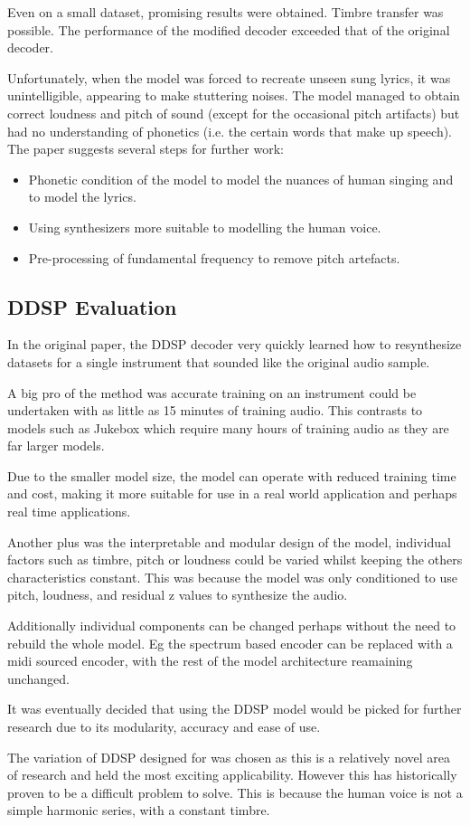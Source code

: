 Even on a small dataset, promising results were obtained. Timbre transfer was possible. The performance of the modified decoder exceeded that of the original decoder.

Unfortunately, when the model was forced to recreate unseen sung lyrics, it was unintelligible, appearing to make stuttering noises. The model managed to obtain correct loudness and pitch of sound (except for the occasional pitch artifacts) but had no understanding of phonetics (i.e. the certain words that make up speech). The paper suggests several steps for further work:

\begin{itemize}
    \item Phonetic condition of the model to model the nuances of human singing and to model the lyrics.
    \item Using synthesizers more suitable to modelling the human voice.
    \item Pre-processing of fundamental frequency to remove pitch artefacts.
\end{itemize}

\subsection{DDSP Evaluation}

In the original paper, the DDSP decoder very quickly learned how to resynthesize datasets for a single instrument that sounded like the original audio sample.

A big pro of the method was accurate training on an instrument could be undertaken with as little as 15 minutes of training audio. This contrasts to models such as Jukebox which require many hours of training audio as they are far larger models.

Due to the smaller model size, the model can operate with reduced training time and cost, making it more suitable for use in a real world application and perhaps real time applications.

Another plus was the interpretable and modular design of the model, individual factors such as timbre, pitch or loudness could be varied whilst keeping the others characteristics constant. This was because the model was only conditioned to use pitch, loudness, and residual z values to synthesize the audio.

Additionally individual components can be changed perhaps without the need to rebuild the whole model. Eg the spectrum based encoder can be replaced with a midi sourced encoder, with the rest of the model architecture reamaining unchanged.

It was eventually decided that using the DDSP model would be picked for further research due to its modularity, accuracy and ease of use.

The variation of DDSP designed for  was chosen as this is a relatively novel area of research and held the most exciting applicability. However this has historically proven to be a difficult problem to solve. This is because the human voice is not a simple harmonic series, with a constant timbre.